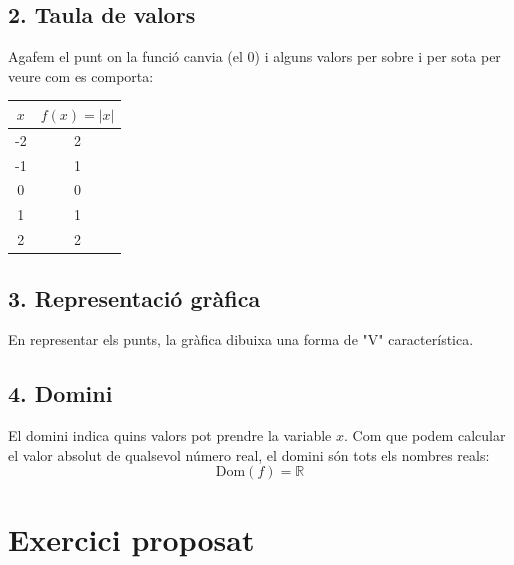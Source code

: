 \documentclass[12pt,a4paper]{article}
\begin{document}
\subsection*{2. Taula de valors}
Agafem el punt on la funció canvia (el $0$) i alguns valors per sobre i per sota per veure com es comporta:

\begin{center}
\renewcommand{\arraystretch}{1.5}
\begin{tabular}{|c|c|}
\hline
\textbf{$x$} & \textbf{$f(x) = |x|$} \\ \hline
-2 & 2 \\ \hline
-1 & 1 \\ \hline
0  & 0 \\ \hline
1  & 1 \\ \hline
2  & 2 \\ \hline
\end{tabular}
\end{center}

\subsection*{3. Representació gràfica}
En representar els punts, la gràfica dibuixa una forma de "V" característica. 

\begin{center}
\end{center}

\subsection*{4. Domini}
El domini indica quins valors pot prendre la variable $x$. Com que podem calcular el valor absolut de qualsevol número real, el domini són tots els nombres reals:
\[
\text{Dom}(f)=\mathbb{R}
\]

\newpage

\section*{Exercici proposat}
\end{document}
